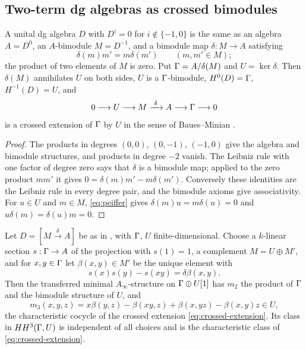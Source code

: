 \subsection{Two-term dg algebras as crossed bimodules}

\begin{lemma}\label{lem:crossed}
A unital dg algebra \(D\) with \(D^i=0\) for \(i\notin\{-1,0\}\) is the same as an algebra \(A=D^0\), an \(A\)-bimodule \(M=D^{-1}\), and a bimodule map \(\delta:M\to A\) satisfying
\begin{equation}\label{eq:peiffer}
 \delta(m)m'=m\delta(m')\qquad(m,m'\in M);
\end{equation}
the product of two elements of \(M\) is zero.  Put \(\Gamma=A/\delta(M)\) and \(U=\ker\delta\).  Then \(\delta(M)\) annihilates \(U\) on both sides, \(U\) is a \(\Gamma\)-bimodule, \(H^0(D)=\Gamma\), \(H^{-1}(D)=U\), and
\begin{equation}\label{eq:crossed-extension}
 0\longrightarrow U\longrightarrow M\xrightarrow{\ \delta\ }A\longrightarrow\Gam\longrightarrow0
\end{equation}
is a crossed extension of \(\Gamma\) by \(U\) in the sense of Baues--Minian \cite{BauesMinian02}.
\end{lemma}

\begin{proof}
The products in degrees \((0,0)\), \((0,-1)\), \((-1,0)\) give the algebra and bimodule structures, and products in degree \(-2\) vanish.  The Leibniz rule with one factor of degree zero says that \(\delta\) is a bimodule map; applied to the zero product \(mm'\) it gives \(0=\delta(m)m'-m\delta(m')\).  Conversely these identities are the Leibniz rule in every degree pair, and the bimodule axioms give associativity.  For \(u\in U\) and \(m\in M\), \eqref{eq:peiffer} gives \(\delta(m)u=m\delta(u)=0\) and \(u\delta(m)=\delta(u)m=0\).
\end{proof}

\begin{lemma}\label{lem:two-term-minimal}
Let \(D=[M\xrightarrow{\delta}A]\) be as in , with \(\Gamma\), \(U\) finite-dimensional.  Choose a \(k\)-linear section \(s:\Gamma\to A\) of the projection with \(s(1)=1\), a complement \(M=U\oplus M'\), and for \(x,y\in\Gamma\) let \(\beta(x,y)\in M'\) be the unique element with
\begin{equation}\label{eq:beta}
 s(x)s(y)-s(xy)=\delta\beta(x,y).
\end{equation}
Then the transferred minimal \(A_\infty\)-structure on \(\Gamma\oplus U[1]\) has \(m_2\) the product of \(\Gamma\) and the bimodule structure of \(U\), and
\begin{equation}\label{eq:m3-cocycle}
 m_3(x,y,z)=x\beta(y,z)-\beta(xy,z)+\beta(x,yz)-\beta(x,y)z\in U,
\end{equation}
the characteristic cocycle of the crossed extension \eqref{eq:crossed-extension}.  Its class in \(HH^3(\Gamma,U)\) is independent of all choices and is the characteristic class of \eqref{eq:crossed-extension}.
\end{lemma}


